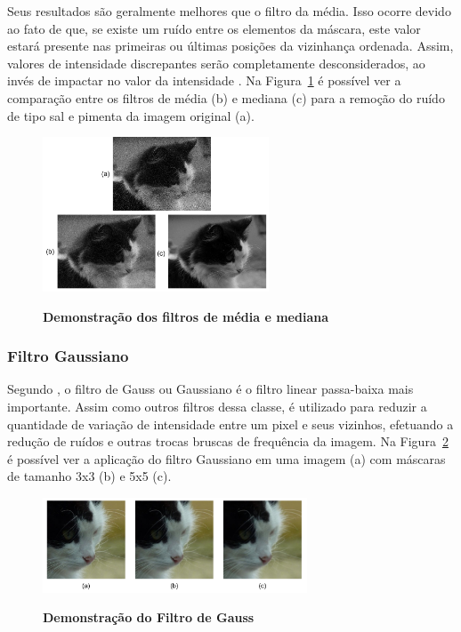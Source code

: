 \documentclass[12pt,oneside,a4paper,english,french,spanish,brazil,]{abntex2}
\begin{document}
Seus resultados são geralmente melhores que o filtro da média. Isso ocorre devido ao fato de que, se existe um ruído entre os elementos da máscara, este valor estará presente nas primeiras ou últimas posições da vizinhança ordenada. Assim, valores de intensidade discrepantes serão completamente desconsiderados, ao invés de impactar no valor da intensidade \cite{conci:2003}. Na Figura~\ref{fig:PDI_Media_Mediana} é possível ver a comparação entre os filtros de média (b) e mediana (c) para a remoção do ruído de tipo sal e pimenta da imagem original (a).

\begin{figure}[ht]
\centering
\caption{\textbf{ Demonstração dos filtros de média e mediana}}
\includegraphics[width=0.6\textwidth]{imagens/PDI_Media_Mediana.pdf}
\sourceAuthor
\label{fig:PDI_Media_Mediana}
\end{figure}

\subsubsection{Filtro Gaussiano}

Segundo \citet{conci:2003}, o filtro de Gauss ou Gaussiano é o filtro linear passa-baixa mais importante. Assim como outros filtros dessa classe, é utilizado para reduzir a quantidade de variação de intensidade entre um pixel e seus vizinhos, efetuando a redução de ruídos e outras trocas bruscas de frequência da imagem. Na Figura~\ref{fig:PDI_Gauss} é possível ver a aplicação do filtro Gaussiano em uma imagem (a) com máscaras de tamanho 3x3 (b) e 5x5 (c).

\begin{figure}[ht]
\centering
\caption{\textbf{Demonstração do Filtro de Gauss}}
\includegraphics[width=0.7\textwidth]{imagens/PDI_Gauss.pdf}
\sourceAuthor
\label{fig:PDI_Gauss}
\end{figure}
\end{document}
